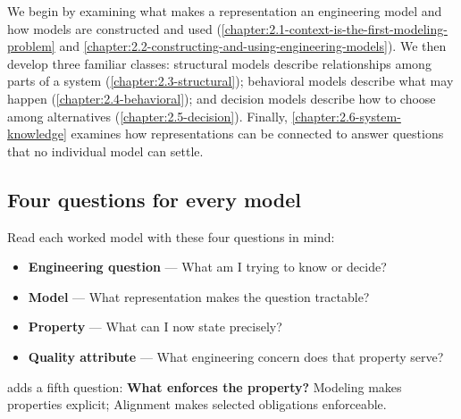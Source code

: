 
We begin by examining what makes a representation an engineering model and how models are constructed and used (\cref{chapter:2.1-context-is-the-first-modeling-problem} and \cref{chapter:2.2-constructing-and-using-engineering-models}). We then develop three familiar classes: structural models describe relationships among parts of a system (\cref{chapter:2.3-structural}); behavioral models describe what may happen (\cref{chapter:2.4-behavioral}); and decision models describe how to choose among alternatives (\cref{chapter:2.5-decision}). Finally, \cref{chapter:2.6-system-knowledge} examines how representations can be connected to answer questions that no individual model can settle.


\subsection{Four questions for every model}\label{heading:four-questions-for-every-model}

Read each worked model with these four questions in mind:

\begin{itemize}
\item
  \textbf{Engineering question} --- What am I trying to know or decide?
\item
  \textbf{Model} --- What representation makes the question tractable?
\item
  \textbf{Property} --- What can I now state precisely?
\item
  \textbf{Quality attribute} --- What engineering concern does that property serve?
\end{itemize}

 adds a fifth question: \textbf{What enforces the property?} Modeling makes properties explicit; Alignment makes selected obligations enforceable.
